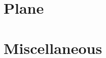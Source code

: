 \documentclass[11pt]{book}
\begin{document}
\section{Plane}

\section{Miscellaneous }

%
%
%
%
%
%
%
%
%

%
\end{document}
